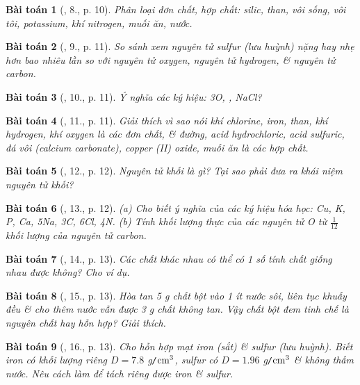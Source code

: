 \documentclass{article}
\newtheorem{baitoan}{Bài toán}
\begin{document}
\begin{baitoan}[\cite{An_Hoa_Hoc_nang_cao_8_9}, 8., p. 10]
	Phân loại đơn chất, hợp chất: silic, than, vôi sống, vôi tôi, potassium, khí nitrogen, muối ăn, nước.
\end{baitoan}

\begin{baitoan}[\cite{An_Hoa_Hoc_nang_cao_8_9}, 9., p. 11]
	So sánh xem nguyên tử sulfur (lưu huỳnh) nặng hay nhẹ hơn bao nhiêu lần so với nguyên tử oxygen, nguyên tử hydrogen, \& nguyên tử carbon.
\end{baitoan}

\begin{baitoan}[\cite{An_Hoa_Hoc_nang_cao_8_9}, 10., p. 11]
	Ý nghĩa các ký hiệu: {\rm3O, , NaCl}?
\end{baitoan}

\begin{baitoan}[\cite{An_Hoa_Hoc_nang_cao_8_9}, 11., p. 11]
	Giải thích vì sao nói khí chlorine, iron, than, khí hydrogen, khí oxygen là các đơn chất, \& đường, acid hydrochloric, acid sulfuric, đá vôi (calcium carbonate), copper (II) oxide, muối ăn là các hợp chất.
\end{baitoan}

\begin{baitoan}[\cite{An_Hoa_Hoc_nang_cao_8_9}, 12., p. 12]
	Nguyên tử khối là gì? Tại sao phải đưa ra khái niệm nguyên tử khối?
\end{baitoan}

\begin{baitoan}[\cite{An_Hoa_Hoc_nang_cao_8_9}, 13., p. 12]
	(a) Cho biết ý nghĩa của các ký hiệu hóa học: {\rm Cu, K, P, Ca, 5Na, 3C, 6Cl, 4N}. (b) Tính khối lượng thực của các nguyên tử {\rm O} từ $\frac{1}{12}$ khối lượng của nguyên tử carbon.
\end{baitoan}

\begin{baitoan}[\cite{An_Hoa_Hoc_nang_cao_8_9}, 14., p. 13]
	Các chất khác nhau có thể có 1 số tính chất giống nhau được không? Cho ví dụ.
\end{baitoan}

\begin{baitoan}[\cite{An_Hoa_Hoc_nang_cao_8_9}, 15., p. 13]
	Hòa tan {\rm5 g} chất bột vào 1 ít nước sôi, liên tục khuấy đều \& cho thêm nước vẫn được {\rm3 g} chất không tan. Vậy chất bột đem tinh chế là nguyên chất hay hỗn hợp? Giải thích.
\end{baitoan}

\begin{baitoan}[\cite{An_Hoa_Hoc_nang_cao_8_9}, 16., p. 13]
	Cho hỗn hợp mạt iron (sắt) \& sulfur (lưu huỳnh). Biết iron có khối lượng riêng $D = 7.8$ {\rm g{\tt/}$\rm cm^3$}, sulfur có  $D = 1.96$ {\rm g{\tt/}$\rm cm^3$} \& không thấm nước. Nêu cách làm để tách riêng được iron \& sulfur.
\end{baitoan}
\end{document}
